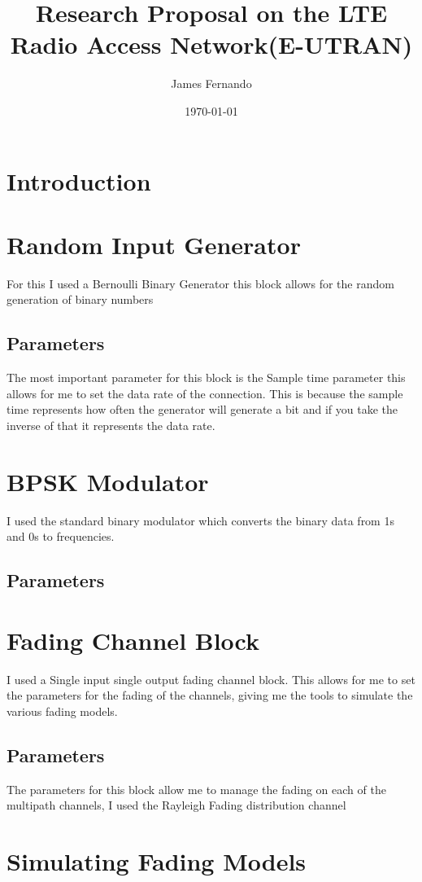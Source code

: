 \documentclass[a4paper,12pt]{scrartcl}
\title{Research Proposal on the LTE Radio Access Network(E-UTRAN)}
\author{James Fernando}
\date{\today}
\begin{document}
	
	\begin{titlepage}
		\maketitle
	\end{titlepage}
	
	\tableofcontents
	\newpage	
{
	\section{Introduction}{
		
	}
	\section{Random Input Generator}
	{
		For this I used a Bernoulli Binary Generator this block allows for the random generation of binary numbers
		\subsection{Parameters}
		{
			The most important parameter for this block is the Sample time parameter this allows for me to set the data rate of the connection. This is because the sample time represents how often the generator will generate a bit and if you take the inverse of that it represents the data rate.
		}
	}
	\section{BPSK Modulator}
	{
		I used the standard binary modulator which converts the binary data from 1s and 0s to frequencies.
		\subsection{Parameters}
	}
	\section{Fading Channel Block}
	{
		I used a Single input single output fading channel block. This allows for me to set the parameters for the fading of the channels, giving me the tools to simulate the various fading models.
		\subsection{Parameters}
		{
			The parameters for this block allow me to manage the fading on each of the multipath channels, I used the Rayleigh Fading distribution channel
		}
	}
	\section{Simulating Fading Models}{
}}
\end{document}
